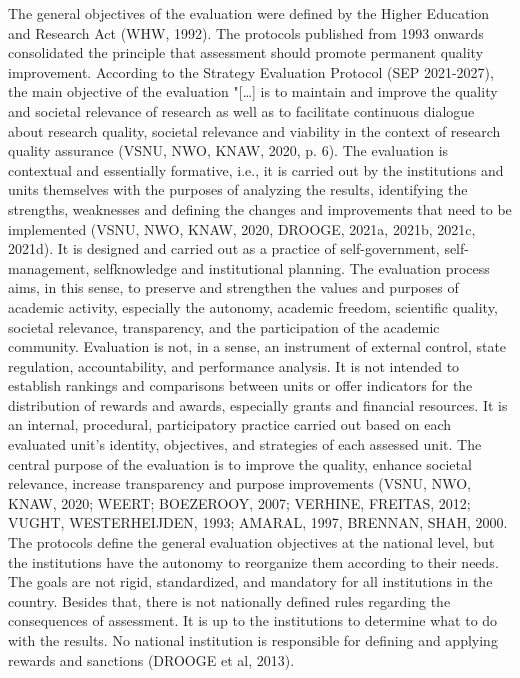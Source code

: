 The general objectives of the evaluation were defined by the Higher Education and Research Act (WHW, 1992). The protocols published from 1993 onwards consolidated the principle that assessment should promote permanent quality improvement. According to the Strategy Evaluation Protocol (SEP 2021-2027), the main objective of the evaluation "[…] is to maintain and improve the quality and societal relevance of research as well as to facilitate continuous dialogue about research quality, societal relevance and viability in the context of research quality assurance (VSNU, NWO, KNAW, 2020, p. 6). The evaluation is contextual and essentially formative, i.e., it is carried out by the institutions and units themselves with the purposes of analyzing the results, identifying the strengths, weaknesses and defining the changes and improvements that need to be implemented (VSNU, NWO, KNAW, 2020, DROOGE, 2021a, 2021b, 
2021c, 2021d). It is designed and carried out as a practice of self-government, self-management, selfknowledge and institutional planning. The evaluation process aims, in this sense, to preserve and strengthen the values and purposes of academic activity, especially the autonomy, academic freedom, scientific quality, societal relevance, transparency, and the participation of the academic community. Evaluation is not, in a sense, an instrument of external control, state regulation, accountability, and performance analysis. It is not intended to establish rankings and comparisons between units or offer indicators for the distribution of rewards and awards, especially grants and financial resources. It is an internal, procedural,  participatory practice carried out based on each evaluated unit's identity, objectives, and strategies of each assessed unit. The central purpose of the evaluation is to improve the quality, enhance societal relevance, increase transparency and purpose improvements (VSNU, NWO, KNAW, 2020; WEERT; BOEZEROOY, 2007; VERHINE, 
FREITAS, 2012; VUGHT, WESTERHEIJDEN, 1993; AMARAL, 1997, BRENNAN, SHAH, 2000. The protocols define the general evaluation objectives at the national level, but the institutions have the autonomy to reorganize them according to their needs. The goals are not rigid, standardized, and mandatory for all institutions in the country. Besides that, there is not nationally defined rules regarding the consequences of assessment. It is up to the institutions to determine what to do with the results. No national institution is responsible for defining and applying rewards and sanctions (DROOGE et al, 2013).    


